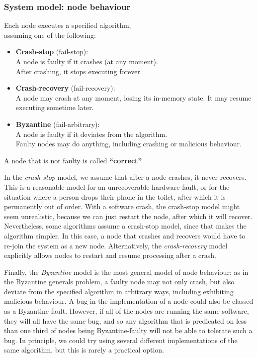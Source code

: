 \begin{frame}
    \label{s:model-nodes}
    \frametitle{System model: node behaviour}
    Each node executes a specified algorithm,\\assuming one of the following:
    \begin{itemize}
        \item \textbf{Crash-stop} (fail-stop):\\
            A node is faulty if it crashes (at any moment).\\
            After crashing, it stops executing forever.\pause
        \item \textbf{Crash-recovery} (fail-recovery):\\
            A node may crash at any moment, losing its in-memory state.
            It may resume executing sometime later.\pause
        \item \textbf{Byzantine} (fail-arbitrary):\\
            A node is faulty if it deviates from the algorithm.\\
            Faulty nodes may do anything, including crashing or malicious behaviour.\\[1em]
    \end{itemize}
    A node that is not faulty is called \textbf{``correct''}
\end{frame}
\label{l:model-nodes}

In the \emph{crash-stop} model, we assume that after a node crashes, it never recovers.
This is a reasonable model for an unrecoverable hardware fault, or for the situation where a person drops their phone in the toilet, after which it is permanently out of order.
With a software crash, the crash-stop model might seem unrealistic, because we can just restart the node, after which it will recover.
Nevertheless, some algorithms assume a crash-stop model, since that makes the algorithm simpler.
In this case, a node that crashes and recovers would have to re-join the system as a new node.
Alternatively, the \emph{crash-recovery} model explicitly allows nodes to restart and resume processing after a crash.

Finally, the \emph{Byzantine} model is the most general model of node behaviour: as in the Byzantine generals problem, a faulty node may not only crash, but also deviate from the specified algorithm in arbitrary ways, including exhibiting malicious behaviour.
A bug in the implementation of a node could also be classed as a Byzantine fault.
However, if all of the nodes are running the same software, they will all have the same bug, and so any algorithm that is predicated on less than one third of nodes being Byzantine-faulty will not be able to tolerate such a bug.
In principle, we could try using several different implementations of the same algorithm, but this is rarely a practical option.

